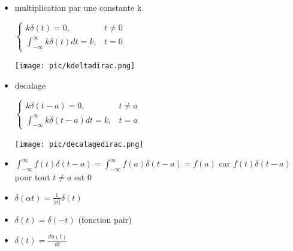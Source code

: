 \documentclass[12pt]{book}
\begin{document}
            \begin{itemize}
                \item multiplication par une constante k
                    \begin{center}
                        \begin{minipage}{0.49\linewidth}
                            $  
                            \begin{cases}
                                k\delta(t) =0 , & t \not = 0 \\
                                \int^\infty_{-\infty}k\delta(t)dt =k, & t =0
                            \end{cases}
                            $
                        \end{minipage}
                        \begin{minipage}{0.39\linewidth}
                            \texttt{[image: pic/kdeltadirac.png]}
                        \end{minipage}
                    \end{center}
                \item decalage 
                    \begin{center}
                        \begin{minipage}{0.49\linewidth}
                            $  
                            \begin{cases}
                                k\delta(t-a) =0 , & t \not = a \\
                                \int^\infty_{-\infty}k\delta(t -a)dt =k, & t =a
                            \end{cases}
                            $
                        \end{minipage}
                        \begin{minipage}{0.39\linewidth}
                            \texttt{[image: pic/decalagedirac.png]}
                        \end{minipage}
                    \end{center}
                \item $\int^\infty_{-\infty}f(t)\delta(t-a) = \int^\infty_{-\infty}f(a)\delta(t-a)=f(a)$ car $f(t)\delta(t-a)$ \\ pour tout $t \not = a$ est 0
                \item $\delta(\alpha t) = \frac{1}{|\alpha|}\delta(t)$
                \item $\delta(t) = \delta(-t)$ (fonction pair)
                \item $\delta(t) = \frac{du(t)}{dt}$
            \end{itemize}
\end{document}
